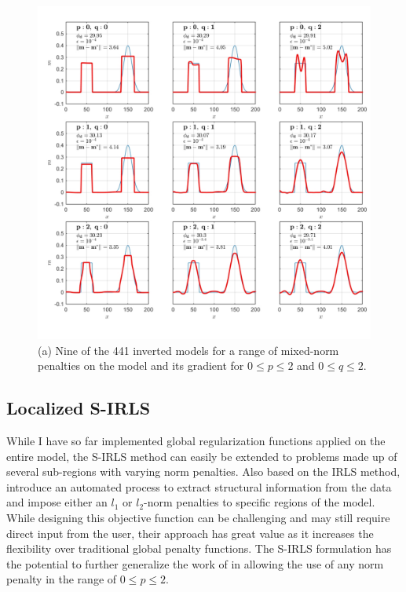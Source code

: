 \begin{figure}[t]
\centering
\includegraphics[scale=0.6, trim= 0.5cm 0 0 0]{1D_Results}
\caption{(a) Nine of the 441 inverted models for a range of mixed-norm penalties on the model and its gradient for $0 \leq p \leq 2$ and $0 \leq q \leq 2$. }
\label{fig:1D_Results}
\end{figure}

\subsection{Localized S-IRLS}\label{Localized_lp}
While I have so far implemented global regularization functions applied on the entire model, the S-IRLS method can easily be extended to problems made up of several sub-regions with varying norm penalties. Also based on the IRLS method, \cite{SunLi14} introduce an automated process to extract structural information from the data and impose either an $l_1$ or $l_2$-norm penalties to specific regions of the model.  
While designing this objective function can be challenging and may still require direct input from the user, their approach has great value as it increases the flexibility over traditional global penalty functions. 
The S-IRLS formulation has the potential to further generalize the work of \cite{SunLi14} in allowing the use of any norm penalty in the range of $0 \leq p \leq 2$. 

